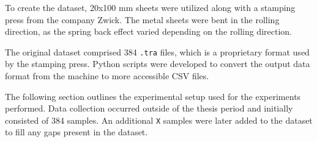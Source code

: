 To create the dataset, 20x100 mm sheets were utilized along with a stamping press from the company Zwick.
The metal sheets were bent in the rolling direction, as the spring back effect varied depending on the rolling
direction.

The original dataset comprised 384 \texttt{.tra} files, which is a proprietary format used by the stamping press.
Python scripts were developed to convert the output data format from the machine to more accessible CSV files.

The following section outlines the experimental setup used for the experiments performed.
Data collection occurred outside of the thesis period and initially consisted of 384 samples.
An additional \texttt{X} samples were later added to the dataset to fill any gaps present in the dataset.



